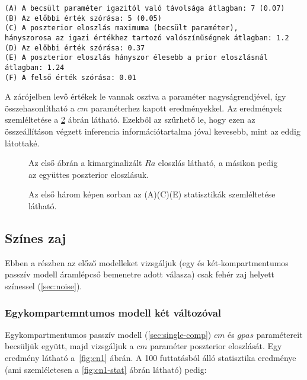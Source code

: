 \begin{verbatim}
(A) A becsült paraméter igazitól való távolsága átlagban: 7 (0.07)
(B) Az előbbi érték szórása: 5 (0.05)
(C) A poszterior eloszlás maximuma (becsült paraméter), 
hányszorosa az igazi értékhez tartozó valószínűségnek átlagban: 1.2
(D) Az előbbi érték szórása: 0.37
(E) A poszterior eloszlás hányszor élesebb a prior eloszlásnál átlagban: 1.24
(F) A felső érték szórása: 0.01
\end{verbatim}
A zárójelben levő értékek le vannak osztva a paraméter nagyságrendjével, így összehasonlítható a $cm$ paraméterhez kapott eredményekkel. Az eredmények szemléltetése a \ref{fig:wn3-stat} ábrán látható. Ezekből az szűrhető le, hogy ezen az összeállításon végzett inferencia információtartalma jóval kevesebb, mint az eddig látottaké.

\begin{figure}
	\hfill
	\hfill
	\hfill
	\caption[Kétkompartmentumos, fehér zaj, két paraméteres becslés]{Az első ábrán a kimarginalizált $Ra$ eloszlás látható, a másikon pedig az együttes poszterior eloszlásuk. }%
	\label{fig:wn3}
\end{figure}

\begin{figure}
	\hfill
	\hfill
	\hfill
	\vfill
	\caption[Kétkompartmentumos, fehér zaj, két paraméter statisztika]{Az első három képen sorban az (A)(C)(E) statisztikák szemléltetése látható.}%
	\label{fig:wn3-stat}
\end{figure}

\FloatBarrier
\subsection{Színes zaj}
Ebben a részben az előző modelleket vizsgáljuk (egy és két-kompartmentumos passzív modell áramlépcső bemenetre adott válasza) csak fehér zaj helyett színessel (\ref{sec:noise}).
\subsubsection{Egykompartemntumos modell két változóval}
Egykompartmentumos passzív modell (\ref{sec:single-comp}) $cm$ és $gpas$ paramétereit becsüljük együtt, majd vizsgáljuk a $cm$ paraméter poszterior eloszlását. Egy eredmény látható a~\ref{fig:cn1} ábrán. A 100 futtatásból álló statisztika eredménye (ami szemléletesen a \ref{fig:cn1-stat} ábrán látható) pedig:

